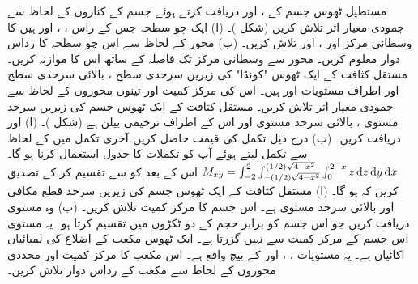 مستطیل ٹھوس جسم کے ،  اور  دریافت کرتے ہوئے جسم کے کناروں کے لحاظ سے جمودی معیار اثر تلاش کریں (شکل )۔
(ا) ایک چو سطحہ جس کے راس ، ،  اور   ہیں کا وسطانی مرکز اور ،  اور  تلاش کریں۔ (ب) محور  کے لحاظ سے اس چو سطحہ کا رداس دوار معلوم کریں۔ محور  سے وسطانی مرکز  تک  فاصلہ کے ساتھ اس کا موازنہ کریں۔
مستقل کثافت کے ایک ٹھوس "کونڈا"  کی زیریں سرحدی سطح ،  بالائی سرحدی سطح  اور اطراف  مستویات  اور  ہیں۔ اس کی مرکز کمیت  اور تینوں محوروں کے لحاظ سے جمودی معیار اثر تلاش کریں۔
مستقل کثافت کے ایک ٹھوس جسم کی زیریں سرحد مستوی ، بالائی سرحد مستوی  اور اس کے اطراف ترخیمی بیلن  ہے (شکل )۔ (ا)   اور  دریافت کریں۔ (ب)  درج ذیل تکمل کی قیمت حاصل کریں۔آخری تکمل میں  کے لحاظ سے تکمل لیتے ہوئے   آپ کو  تکملات کا جدول استعمال کرنا ہو گا۔
$M_{xy}=\int_{-2}^{2}\int_{-(1/2)\sqrt{4-x^2}}^{(1/2)\sqrt{4-x^2}}\int_{0}^{2-x}z\dif z\dif y\dif x$
اس کے بعد  کو  سے تقسیم کر کے تصدیق کریں کہ  ہو گا۔
(ا) مستقل کثافت کے ایک ٹھوس جسم کی زیریں سرحد قطع مکافی  اور بالائی سرحد مستوی  ہے۔ اس جسم  کا مرکز کمیت تلاش کریں۔ (ب)  وہ مستوی  دریافت کریں جو اس جسم کو برابر حجم کے دو ٹکڑوں میں تقسیم کرتا ہو۔ یہ مستوی اس جسم کے  مرکز کمیت سے نہیں گزرتا ہے۔
ایک ٹھوس مکعب کے اضلاع  کی لمبائیاں   اکائیاں ہے۔ یہ مستویات ، ،   اور   کے بیچ واقع ہے۔ اس مکعب کا مرکز کمیت اور محددی محوروں کے لحاظ سے مکعب کے  رداس دوار تلاش کریں۔

